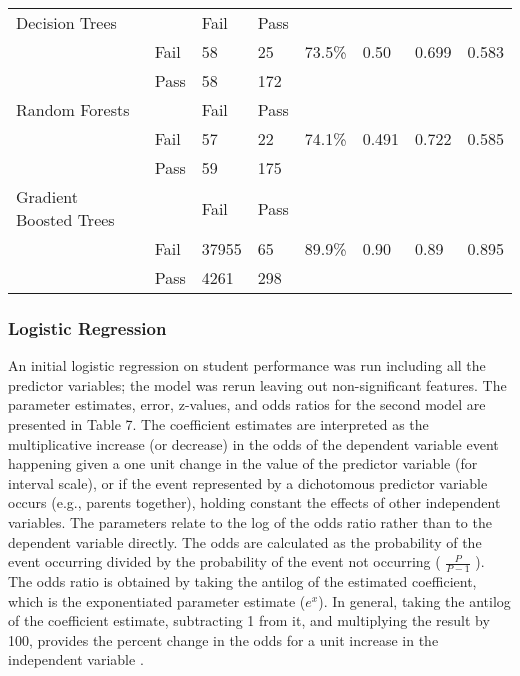 \begin{table*}[ht]
\begin{tabular}{llllllll}
    \midrule
    Decision Trees & & Fail & Pass &  &  &  & \\
     & Fail &  58 &  25 & 73.5\% & 0.50 & 0.699 & 0.583 \\
     & Pass &  58 & 172 &  &  &  & \\
    \midrule
    Random Forests & & Fail & Pass &  &  &  & \\
     & Fail &  57 &  22 & 74.1\% & 0.491 & 0.722 & 0.585 \\
     & Pass &  59 & 175 &  &  &  & \\
    \midrule
    Gradient Boosted Trees & & Fail & Pass &  &  &  & \\
     & Fail & 37955 &  65 & 89.9\% & 0.90 & 0.89 & 0.895 \\
     & Pass & 4261 & 298 &  &  &  & \\
    \bottomrule
  \end{tabular}
\end{table*}


\subsubsection{Logistic Regression}

An initial logistic regression on student performance was run including all 
the predictor variables; the model was rerun leaving out non-significant 
features. The parameter estimates, error, z-values, and odds ratios for the 
second model are presented in Table 7. The coefficient estimates are 
interpreted as the multiplicative increase (or decrease) in the odds of the 
dependent variable event happening given a one unit change in the value of 
the predictor variable (for interval scale), or if the event represented 
by a dichotomous predictor variable occurs (e.g., parents together), holding
constant the effects of other independent variables. The parameters relate to 
the log of the odds ratio rather than to the dependent variable directly. 
The odds are calculated as the probability of the event occurring divided 
by the probability of the event not occurring ( \(\frac{P}{P-1}\) ). The 
odds ratio is obtained by taking the antilog of the estimated coefficient, 
which is the exponentiated parameter estimate ($e^x$). In general, taking the 
antilog of the coefficient estimate, subtracting 1 from it, and multiplying 
the result by 100, provides the percent change in the odds for a unit 
increase in the independent variable  \cite{gujarati09}.  







